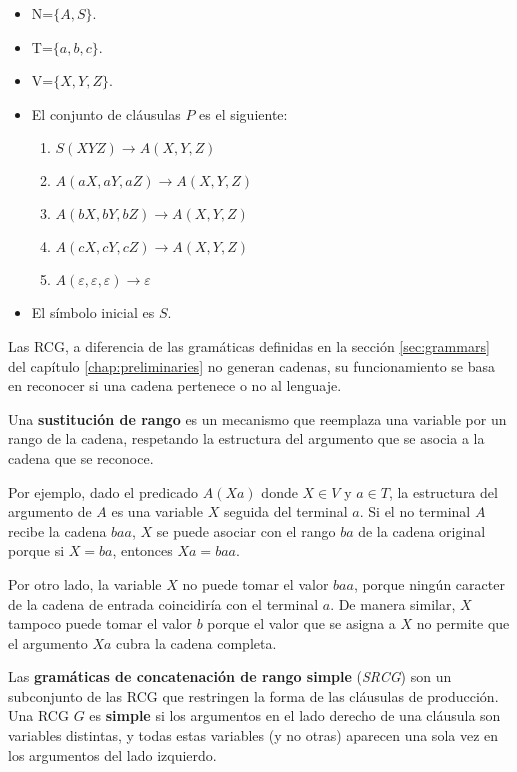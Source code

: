 \begin{itemize}
    \item  N=$\{A,S\}$.
    \item T=$\{a,b,c\}$.
    \item V=$\{X,Y,Z\}$.
    \item El conjunto de cláusulas $P$ es el siguiente:
          \begin{enumerate}
              \item $S(XYZ)\to A(X,Y,Z)$
              \item $A(aX,aY,aZ)\to A(X,Y,Z)$
              \item $A(bX,bY,bZ)\to A(X,Y,Z)$
              \item $A(cX,cY,cZ)\to A(X,Y,Z)$
              \item $A(\varepsilon,\varepsilon,\varepsilon)\to \varepsilon$
          \end{enumerate}
    \item El símbolo inicial es $S$.
\end{itemize}


Las RCG, a diferencia de las gramáticas definidas en la sección \ref{sec:grammars} del capítulo \ref{chap:preliminaries} no generan cadenas, su funcionamiento se basa en reconocer si una cadena pertenece o no al lenguaje.


\begin{definition}
    Una \textbf{sustitución de rango} es un mecanismo que reemplaza una variable por un 
    rango de la cadena, respetando la estructura del argumento que se asocia a la cadena que se reconoce. 
\end{definition}

Por ejemplo, dado el predicado $A(Xa)$ donde $X \in V$ y $a \in T$, la estructura del argumento de $A$ es una variable $X$ seguida del terminal $a$. Si el no terminal $A$ recibe la cadena $baa$, $X$ se puede asociar con el rango $ba$ de la cadena original porque si $X=ba$, entonces $Xa=baa$.

Por otro lado, la variable $X$ no puede tomar el valor $baa$, porque ningún caracter de la cadena de entrada coincidiría 
con el terminal $a$. De manera similar, $X$ tampoco puede tomar el valor $b$ porque el valor que se asigna a $X$ no permite que el argumento $Xa$ cubra la cadena completa.

\begin{definition}
    Las \textbf{gramáticas de concatenación de rango simple}
    (\textit{SRCG}) son un subconjunto de las RCG que restringen la forma de las cláusulas de producción.  
    Una RCG $G$ es \textbf{simple} si los argumentos en el lado derecho de una cláusula son variables distintas, 
    y todas estas variables (y no otras) aparecen una sola vez en los argumentos del lado izquierdo.  
\end{definition}


